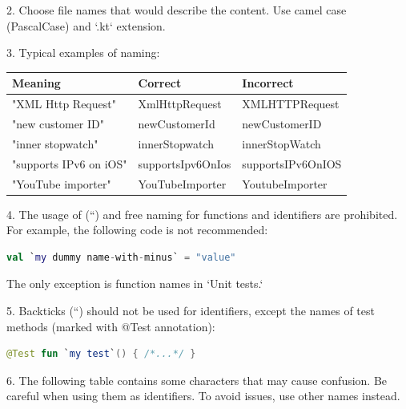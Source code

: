2.	Choose file names that would describe the content. Use camel case (PascalCase) and `.kt` extension.



3.	Typical examples of naming:



\begin{center}

\begin{tabular}{ |p{}|p{}|p{}| }

\hline

Meaning&Correct&Incorrect\\

\hline

 "XML Http Request" & XmlHttpRequest & XMLHTTPRequest \\

 "new customer ID" & newCustomerId & newCustomerID \\

 "inner stopwatch" & innerStopwatch & innerStopWatch \\

 "supports IPv6 on iOS" & supportsIpv6OnIos & supportsIPv6OnIOS \\

 "YouTube importer" & YouTubeImporter & YoutubeImporter \\

\hline

\end{tabular}

\end{center}

4.	The usage of (``) and free naming for functions and identifiers are prohibited. For example, the following code is not recommended:



\begin{lstlisting}[language=Kotlin]
val `my dummy name-with-minus` = "value" 
\end{lstlisting}


The only exception is function names in `Unit tests.`



5.	Backticks (``) should not be used for identifiers, except the names of test methods (marked with @Test annotation):

\begin{lstlisting}[language=Kotlin]
 @Test fun `my test`() { /*...*/ }
\end{lstlisting}
6.  The following table contains some characters that may cause confusion. Be careful when using them as identifiers. To avoid issues, use other names instead.

